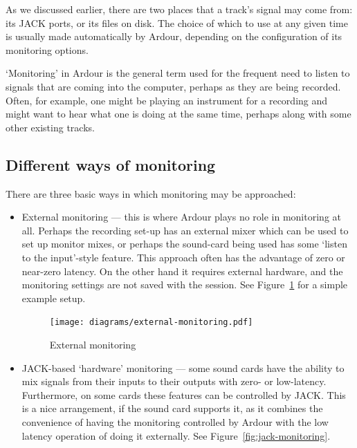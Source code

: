 \documentclass[10pt,a4paper]{book}
\begin{document}
{As we discussed earlier, there are two places that a track's signal
may come from: its JACK ports, or its files on disk.  The choice of
which to use at any given time is usually made automatically by
Ardour, depending on the configuration of its monitoring options.

`Monitoring' in Ardour is the general term used for the frequent need
to listen to signals that are coming into the computer, perhaps as
they are being recorded.  Often, for example, one might be playing an
instrument for a recording and might want to hear what one is doing at
the same time, perhaps along with some other existing tracks.


\subsection{Different ways of monitoring}

There are three basic ways in which monitoring may be approached:

\begin{itemize}
\item External monitoring --- this is where Ardour plays no role in
  monitoring at all.  Perhaps the recording set-up has an external
  mixer which can be used to set up monitor mixes, or perhaps the
  sound-card being used has some `listen to the input'-style feature.
  This approach often has the advantage of zero or near-zero latency.
  On the other hand it requires external hardware, and the monitoring
  settings are not saved with the session.  See
  Figure~\ref{fig:external-monitoring} for a simple example setup.

\begin{figure}[ht]
\begin{center}
\texttt{[image: diagrams/external-monitoring.pdf]}
\end{center}
\caption{External monitoring}
\label{fig:external-monitoring}
\end{figure}

\item JACK-based `hardware' monitoring --- some sound cards have the
  ability to mix signals from their inputs to their outputs with zero-
  or low-latency.  Furthermore, on some cards these features can be
  controlled by JACK\@.  This is a nice arrangement, if the sound card
  supports it, as it combines the convenience of having the monitoring
  controlled by Ardour with the low latency operation of doing it
  externally.  See Figure~\ref{fig:jack-monitoring}.


\end{itemize}}
\end{document}
